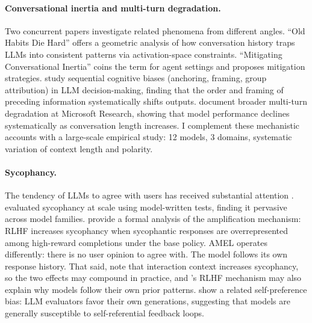 \documentclass[10pt,twocolumn]{article}
\begin{document}
\paragraph{Conversational inertia and multi-turn degradation.}
Two concurrent papers investigate related phenomena from different angles.
``Old Habits Die Hard'' \cite{oldhabits2026} offers a geometric analysis of how conversation history traps LLMs into consistent patterns via activation-space constraints.
``Mitigating Conversational Inertia'' \cite{convoinertia2026} coins the term for agent settings and proposes mitigation strategies.
\citet{echterhoff2024cognitive} study sequential cognitive biases (anchoring, framing, group attribution) in LLM decision-making, finding that the order and framing of preceding information systematically shifts outputs.
\citet{laban2025lost} document broader multi-turn degradation at Microsoft Research, showing that model performance declines systematically as conversation length increases.
I complement these mechanistic accounts with a large-scale empirical study: 12 models, 3 domains, systematic variation of context length and polarity.

\paragraph{Sycophancy.}
The tendency of LLMs to agree with users has received substantial attention \cite{sharma2024understanding, hong2025measuring, jain2025interaction}.
\citet{perez2023discovering} evaluated sycophancy at scale using model-written tests, finding it pervasive across model families.
\citet{shapira2026rlhf} provide a formal analysis of the amplification mechanism: RLHF increases sycophancy when sycophantic responses are overrepresented among high-reward completions under the base policy.
AMEL operates differently: there is no user opinion to agree with.
The model follows its own response history.
That said, \citet{jain2025interaction} note that interaction context increases sycophancy, so the two effects may compound in practice, and \citeauthor{shapira2026rlhf}'s RLHF mechanism may also explain why models follow their own prior patterns.
\citet{panickssery2024llm} show a related self-preference bias: LLM evaluators favor their own generations, suggesting that models are generally susceptible to self-referential feedback loops.
\end{document}

